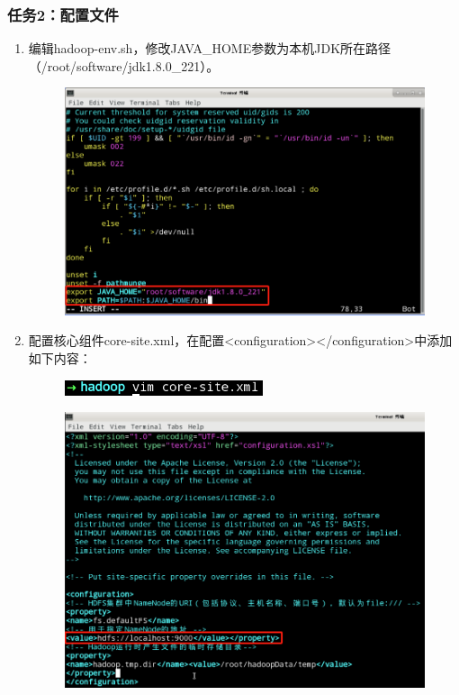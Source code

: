 \documentclass {article}
\begin{document}
			\subsubsection{任务2：配置文件}
				\begin{enumerate}
					\item 编辑hadoop-env.sh，修改JAVA\_HOME参数为本机JDK所在路径（/root/software/jdk1.8.0\_221）。
					\begin{figure}[H]
						\centering
						\includegraphics[width=4.5in]{figures/fig20.png}
					\end{figure}
				
					\item 配置核心组件core-site.xml，在配置<configuration></configuration>中添加如下内容：
					\begin{figure}[H]
						\centering
						\includegraphics{figures/fig21.png}
					\end{figure}
				
					\begin{figure}[H]
						\centering
						\includegraphics[width=4.5in]{figures/fig22.png}
					\end{figure}
				

\end{enumerate}
\end{document}
